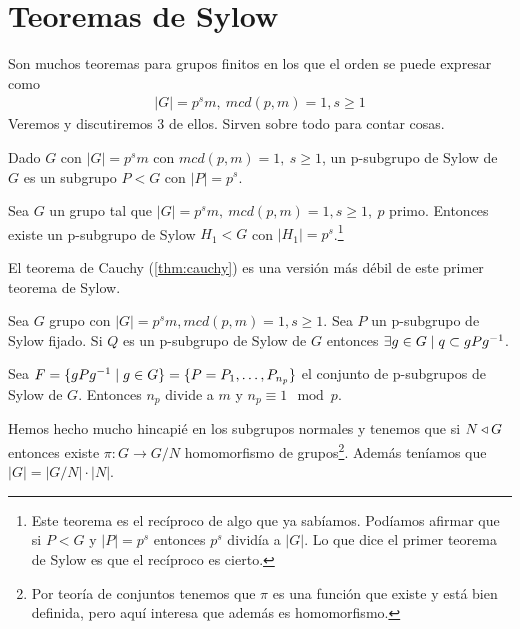 
\chapter{Teoremas de Sylow}


Son muchos teoremas para grupos finitos en los que el orden se puede expresar como
\begin{align}
	|G| = p^s m,\ mcd(p, m) = 1, s \geq 1
\end{align}
Veremos y discutiremos 3 de ellos. Sirven sobre todo para contar cosas.

\begin{dfn}
	Dado $G$ con $|G| = p^sm$ con $mcd(p,m) = 1,\ s \geq 1$, un p-subgrupo de Sylow de $G$ es un subgrupo $P < G$ con $|P| = p^s$.
\end{dfn}

\begin{thm}
	\label{thm:sylow1}
	Sea $G$ un grupo tal que $|G| = p^s m,\ mcd(p, m) = 1, s \geq 1,\ p$ primo. Entonces existe un p-subgrupo de Sylow $H_1 < G$ con $|H_1| = p^s$.\footnote{Este teorema es el recíproco de algo que ya sabíamos. Podíamos afirmar que si $P < G$ y $|P| = p^s$ entonces $p^s$ dividía a $|G|$. Lo que dice el primer teorema de Sylow es que el recíproco es cierto.}
\end{thm}

El teorema de Cauchy (\ref{thm:cauchy}) es una versión más débil de este primer teorema de Sylow.

\begin{thm}
	\label{thm:sylow2}
	Sea $G$ grupo con $|G| = p^s m, mcd(p, m) = 1, s \geq 1$. Sea $P$ un p-subgrupo de Sylow fijado. Si $Q$ es un p-subgrupo de Sylow de $G$ entonces $\exists g \in G \mid q \subset gPg^{-1}$.
\end{thm}

\begin{thm}
	\label{thm:sylow3}
	Sea $F = \{g P g^{-1} \mid g \in G \} = \{P = P_{1}, \dots, P_{n_p}\}$ el conjunto de p-subgrupos de Sylow de $G$. Entonces $n_p$ divide a $m$ y $n_p \equiv 1 \mod p$.
\end{thm}

Hemos hecho mucho hincapié en los subgrupos normales y tenemos que si $N \mathbin{\triangleleft} G$ entonces existe $\pi:G \to G/N$ homomorfismo de grupos\footnote{Por teoría de conjuntos tenemos que $\pi$ es una función que existe y está bien definida, pero aquí interesa que además es homomorfismo.}. Además teníamos que $|G| = |G/N| \cdot |N|$.

